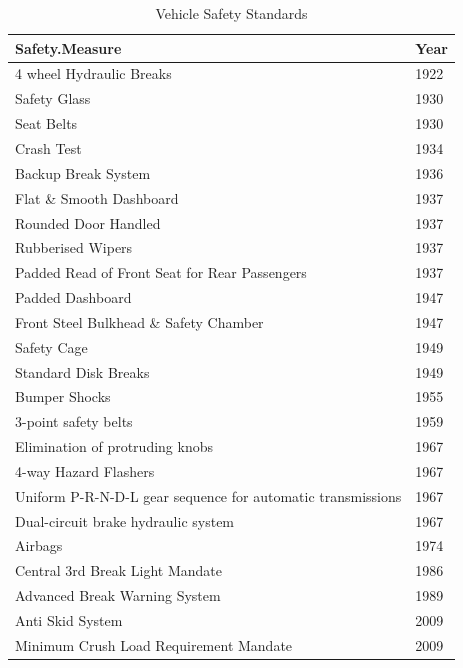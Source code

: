 \documentclass[
  man,floatsintext]{apa7}
\begin{document}
\begin{table}[tbp]

\begin{center}
\begin{threeparttable}

\caption{\label{tab:car-safety-introduction}Vehicle Safety Standards}

\begin{tabular}{ll}
\toprule
Safety.Measure & \multicolumn{1}{c}{Year}\\
\midrule
4 wheel Hydraulic Breaks & 1922\\
Safety Glass & 1930\\
Seat Belts & 1930\\
Crash Test & 1934\\
Backup Break System & 1936\\
Flat \& Smooth Dashboard & 1937\\
Rounded Door Handled & 1937\\
Rubberised Wipers & 1937\\
Padded Read of Front Seat for Rear Passengers & 1937\\
Padded Dashboard & 1947\\
Front Steel Bulkhead \& Safety Chamber & 1947\\
Safety Cage & 1949\\
Standard Disk Breaks & 1949\\
Bumper Shocks & 1955\\
3-point safety belts & 1959\\
Elimination of protruding knobs & 1967\\
4-way Hazard Flashers & 1967\\
Uniform P-R-N-D-L gear sequence for automatic transmissions & 1967\\
Dual-circuit brake hydraulic system & 1967\\
Airbags & 1974\\
Central 3rd Break Light Mandate & 1986\\
Advanced Break Warning System & 1989\\
Anti Skid System & 2009\\
Minimum Crush Load Requirement Mandate & 2009\\
\bottomrule
\end{tabular}

\end{threeparttable}
\end{center}

\end{table}
\end{document}
